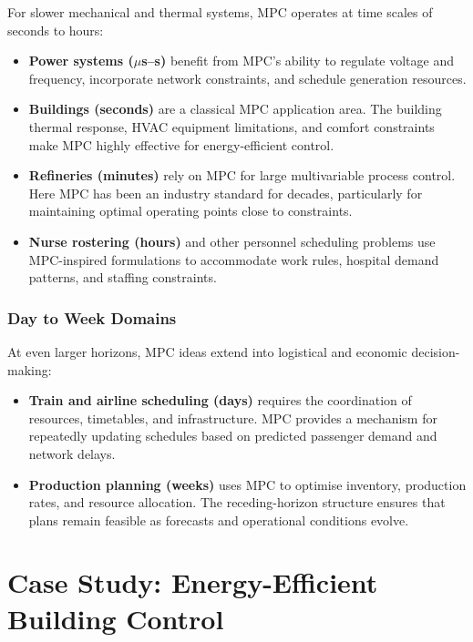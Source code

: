 For slower mechanical and thermal systems, MPC operates at time scales of
seconds to hours:
\begin{itemize}
	\item \textbf{Power systems ($\mu$s--s)} benefit from MPC’s ability to
	regulate voltage and frequency, incorporate network constraints, and
	schedule generation resources.
	
	\item \textbf{Buildings (seconds)} are a classical MPC application area.
	The building thermal response, HVAC equipment limitations, and comfort
	constraints make MPC highly effective for energy-efficient control.
	
	\item \textbf{Refineries (minutes)} rely on MPC for large multivariable
	process control. Here MPC has been an industry standard for decades,
	particularly for maintaining optimal operating points close to constraints.
	
	\item \textbf{Nurse rostering (hours)} and other personnel scheduling
	problems use MPC-inspired formulations to accommodate work rules,
	hospital demand patterns, and staffing constraints.
\end{itemize}

\subsubsection*{Day to Week Domains}

At even larger horizons, MPC ideas extend into logistical and economic
decision-making:
\begin{itemize}
	\item \textbf{Train and airline scheduling (days)} requires the coordination of resources,
	timetables, and infrastructure. MPC provides a mechanism for repeatedly
	updating schedules based on predicted passenger demand and network delays.
	
	\item \textbf{Production planning (weeks)} uses MPC to optimise inventory,
	production rates, and resource allocation. The receding-horizon structure
	ensures that plans remain feasible as forecasts and operational conditions
	evolve.
\end{itemize}


\section{Case Study: Energy-Efficient Building Control}

